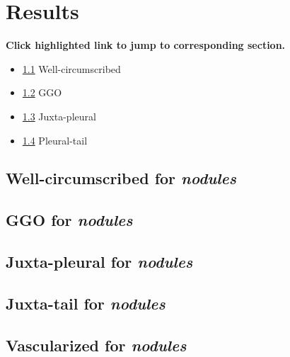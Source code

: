 \documentclass[onecolumn]{IEEEtran}
\begin{document}
\section{Results}
\textbf{Click highlighted link to jump to corresponding section.}
\begin{itemize}
\item \ref{iso} Well-circumscribed
\item \ref{ggo} GGO
\item \ref{vessel} Juxta-pleural
\item \ref{tail} Pleural-tail
\end{itemize}

\newpage
\subsection{Well-circumscribed for \emph{nodules}}
\label{iso}

\subsection{GGO for \emph{nodules}}
\label{ggo}

\subsection{Juxta-pleural for \emph{nodules}}
\label{vessel}

\subsection{Juxta-tail for \emph{nodules}}
\label{tail}

\subsection{Vascularized for \emph{nodules}}
\end{document}
